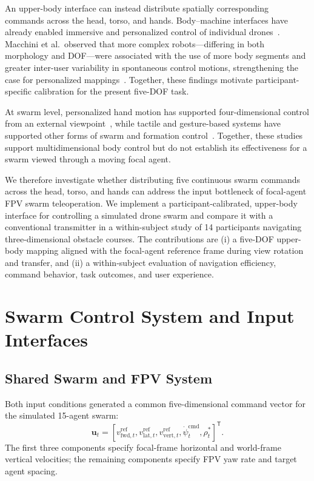 \documentclass[a4paper,10pt,conference]{ieeeconf}
\begin{document}
An upper-body interface can instead distribute spatially corresponding commands
across the head, torso, and hands. Body--machine interfaces have already enabled
immersive and personalized control of individual drones~\cite{rognon2018flyjacket,miehlbradt2018datadriven,
macchini2024datadriven}. Macchini et al.\ observed that more complex robots—differing in both morphology and DOF—were associated with the use of more body segments and greater inter-user variability in spontaneous control motions, strengthening the case for personalized mappings~\cite{macchini2024datadriven}. Together, these findings motivate participant-specific calibration for the present five-DOF task.

At swarm level, personalized hand
motion has supported four-dimensional control from an external viewpoint~\cite{macchini2021personalized}, while tactile and gesture-based systems have
supported other forms of swarm and formation control~\cite{tsykunov2019swarmtouch,kratky2025gesture}. Together, these studies support multidimensional body control but do not establish its effectiveness for a swarm viewed through a moving focal agent. 

We therefore investigate whether distributing five continuous swarm commands
across the head, torso, and hands can address the input bottleneck of
focal-agent FPV swarm teleoperation. We implement a participant-calibrated, upper-body interface for controlling a simulated drone swarm and compare it with a conventional transmitter in a within-subject study of 14 participants navigating three-dimensional obstacle courses. The contributions are (i) a five-DOF
upper-body mapping aligned with the focal-agent reference frame during view
rotation and transfer, and (ii) a within-subject evaluation of navigation
efficiency, command behavior, task outcomes, and user experience.

\section{Swarm Control System and Input Interfaces}

\subsection{Shared Swarm and FPV System}
\label{sec:system}
Both input conditions generated a common five-dimensional command vector for the simulated 15-agent swarm:
\begin{equation}
\mathbf{u}_t =
\left[
v_{\mathrm{fwd},t}^{\mathrm{ref}},
v_{\mathrm{lat},t}^{\mathrm{ref}},
v_{\mathrm{vert},t}^{\mathrm{ref}},
\dot{\psi}_{t}^{\mathrm{cmd}},
\rho_t^{*}
\right]^{\mathsf T}.
\label{eq:swarm_command}
\end{equation}
The first three components specify focal-frame horizontal and world-frame vertical velocities; the remaining components specify FPV yaw rate and target agent spacing.
\end{document}
